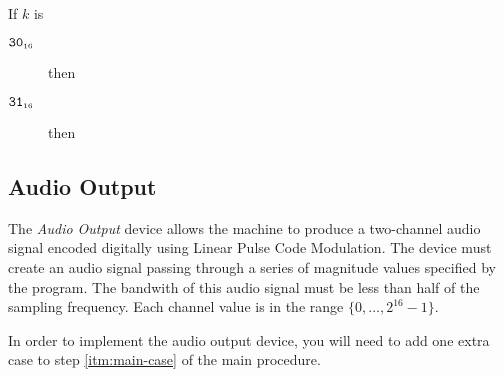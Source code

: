 \documentclass[a4paper,12pt]{article}
\newcommand{\num}[1]{\texttt{#1}}
\newcommand{\hex}[1]{\num{#1}_{\textup{\tiny 16}}}
\newcommand{\range}[2]{\{#1,\ldots,#2\}}
\newcommand{\proc}[1]{\textsc{#1}}
\newcommand{\op}[1]{$#1$}
\newcommand{\NEWFRAME}  [1]{\op{\hex{30}}}
\newcommand{\SETPIXEL}  [1]{\op{\hex{31}}}
\begin{document}
\begin{stepnumbers}[start=3]
\item If $k$ is
  \begin{description}
  \item[\NEWFRAME{}] then
  \item[\SETPIXEL{}] then
  \end{description}
\end{stepnumbers}

\subsection{Audio Output}

The \emph{Audio Output} device allows the machine to produce a two-channel audio signal encoded digitally using Linear Pulse Code Modulation.
The device must create an audio signal passing through a series of magnitude values specified by the program.
The bandwith of this audio signal must be less than half of the sampling frequency.
Each channel value is in the range $\range{0}{2^{16}-1}$.

In order to implement the audio output device, you will need to add one extra case to step \ref{itm:main-case} of the main procedure.
\end{document}

